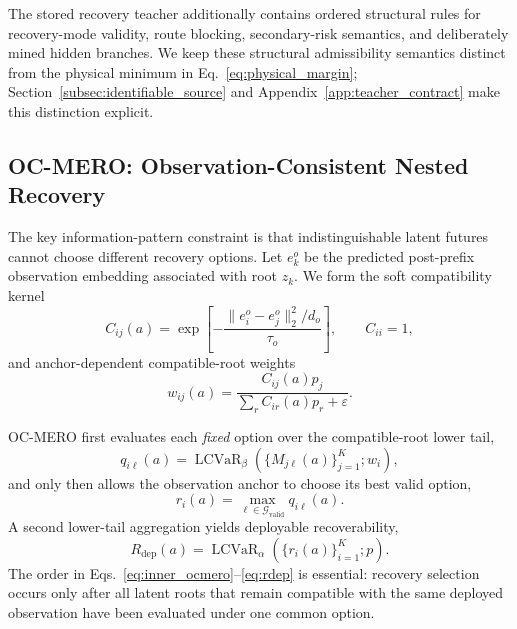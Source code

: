 \documentclass{article} %
\DeclareMathOperator{\LCVaR}{LCVaR}
\newcommand{\cG}{\mathcal{G}}
\newcommand{\Rdep}{R_{\mathrm{dep}}}
\newcommand{\eps}{\varepsilon}
\begin{document}
The stored recovery teacher additionally contains ordered structural rules for recovery-mode validity, route blocking, secondary-risk semantics, and deliberately mined hidden branches. We keep these structural admissibility semantics distinct from the physical minimum in Eq.~\eqref{eq:physical_margin}; Section~\ref{subsec:identifiable_source} and Appendix~\ref{app:teacher_contract} make this distinction explicit.

\subsection{OC-MERO: Observation-Consistent Nested Recovery}
\label{subsec:ocmero}

The key information-pattern constraint is that indistinguishable latent futures cannot choose different recovery options. Let $e_k^o$ be the predicted post-prefix observation embedding associated with root $z_k$. We form the soft compatibility kernel
\begin{equation}
 C_{ij}(a)=\exp\!\left[-\frac{\|e_i^o-e_j^o\|_2^2/d_o}{\tau_o}\right],
 \qquad C_{ii}=1,
 \label{eq:compatibility}
\end{equation}
and anchor-dependent compatible-root weights
\begin{equation}
 w_{ij}(a)=\frac{C_{ij}(a)p_j}{\sum_r C_{ir}(a)p_r+\eps}.
 \label{eq:compat_weight}
\end{equation}

OC-MERO first evaluates each \emph{fixed} option over the compatible-root lower tail,
\begin{equation}
 q_{i\ell}(a)=
 \LCVaR_{\beta}\!\left(\{M_{j\ell}(a)\}_{j=1}^{K};w_i\right),
 \label{eq:inner_ocmero}
\end{equation}
and only then allows the observation anchor to choose its best valid option,
\begin{equation}
 r_i(a)=\max_{\ell\in\cG_{\mathrm{valid}}}q_{i\ell}(a).
 \label{eq:anchor_recovery}
\end{equation}
A second lower-tail aggregation yields deployable recoverability,
\begin{equation}
 \Rdep(a)=\LCVaR_{\alpha}\!\left(\{r_i(a)\}_{i=1}^{K};p\right).
 \label{eq:rdep}
\end{equation}
The order in Eqs.~\eqref{eq:inner_ocmero}--\eqref{eq:rdep} is essential: recovery selection occurs only after all latent roots that remain compatible with the same deployed observation have been evaluated under one common option.
\end{document}
